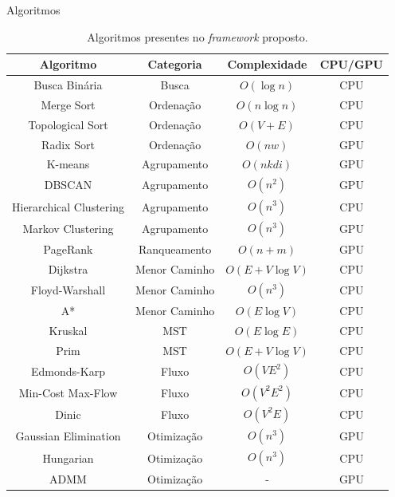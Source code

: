 \begin{frame}{Algoritmos}
    \begin{table}[ht]
        \centering
        \scriptsize
        \begin{tabular}{|c|c|c|c|}
            \hline
            \textbf{Algoritmo} & \textbf{Categoria} & \textbf{Complexidade} & \textbf{CPU/GPU} \\
            \hline
            Busca Binária & Busca & $O(\log n)$ & CPU \\
            \hline
            Merge Sort & Ordenação & $O(n \log n)$ & CPU \\
            \hline
            Topological Sort & Ordenação & $O(V + E)$ & CPU \\
            \hline
            Radix Sort & Ordenação & $O(nw)$ & GPU \\
            \hline
            K-means & Agrupamento & $O(nkdi)$ & GPU \\
            \hline
            DBSCAN & Agrupamento & $O(n^2)$ & GPU \\
            \hline
            Hierarchical Clustering & Agrupamento & $O(n^3)$ & CPU \\
            \hline
            Markov Clustering & Agrupamento & $O(n^3)$ & GPU \\
            \hline
            PageRank & Ranqueamento & $O(n + m)$ & GPU \\
            \hline
            Dijkstra & Menor Caminho & $O(E + V \log V)$ & CPU \\
            \hline
            Floyd-Warshall & Menor Caminho & $O(n^3)$ & CPU \\
            \hline
            A* & Menor Caminho & $O(E \log V)$ & CPU \\
            \hline
            Kruskal & MST & $O(E \log E)$ & CPU \\
            \hline
            Prim & MST & $O(E + V \log V)$ & CPU \\
            \hline
            Edmonds-Karp & Fluxo & $O(VE^2)$ & CPU \\
            \hline
            Min-Cost Max-Flow & Fluxo & $O(V^2E^2)$ & CPU \\
            \hline
            Dinic & Fluxo & $O(V^2E)$ & CPU \\
            \hline
            Gaussian Elimination & Otimização & $O(n^3)$ & GPU \\
            \hline
            Hungarian & Otimização & $O(n^3)$ & CPU \\
            \hline
            ADMM & Otimização & - & GPU \\
            \hline
        \end{tabular}
        \caption{Algoritmos presentes no \textit{framework} proposto.}
        \label{table:algorithms}
    \end{table}
\end{frame}
